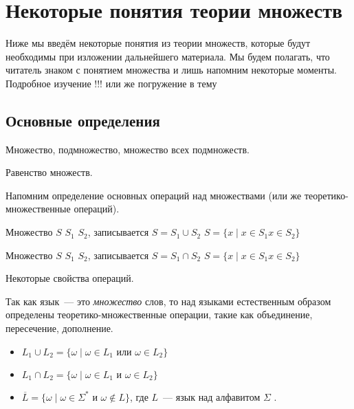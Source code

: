\setchapterpreamble[u]{\margintoc}
\chapter{Некоторые понятия теории множеств}

Ниже мы введём некоторые понятия из теории множеств, которые будут необходимы при изложении дальнейшего материала.
Мы будем полагать, что читатель знаком с понятием множества и лишь напомним некоторые моменты. 
Подробное изучение !!! или же погружение в тему\sidenote{!!!} 

\section{Основные определения}

Множество, подмножество, множество всех подмножеств.

Равенство множеств.

Напомним определение основных операций над множествами (или же теоретико-множественные операций).

\begin{definition}
    Множество $S$ $S_1$ $S_2$, записывается $S = S_1 \cup S_2$  $S = \{ x \mid x \in S_1 x \in S_2\}$  
\end{definition}

\begin{definition}
    Множество $S$ $S_1$ $S_2$, записывается $S = S_1 \cap S_2$ $S = \{ x \mid x \in S_1 x \in S_2\}$
\end{definition}

\begin{definition}
    
\end{definition}

Некоторые свойства операций.



Так как язык~--- это \emph{множество} слов, то над языками естественным образом определены теоретико-множественные операции, такие как объединение, пересечение, дополнение.
\begin{itemize}
    \item $L_1 \cup L_2 = \{ \omega \mid \omega \in L_1 \text{ или } \omega \in L_2\}$
    \item $L_1 \cap L_2 = \{ \omega \mid \omega \in L_1 \text{ и } \omega \in L_2\}$
    \item $\overline{L} = \{ \omega \mid \omega \in \Sigma^* \text{ и } \omega \notin L\}$, где $L$~--- язык над алфавитом $\Sigma$ .
\end{itemize}


